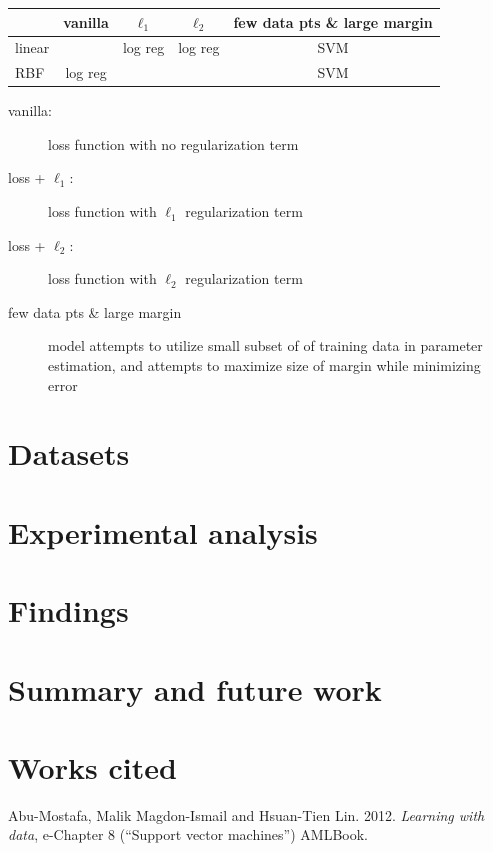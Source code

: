 \documentclass[letterpaper, 11pt]{article}
\begin{document}
\begin{center}
  \begin{tabular}{l|c|c|c|c|}
         & vanilla & $\ell_1$ & $\ell_2$ & few data pts \& large margin \\
\hline
  linear &         & log reg  & log reg  & SVM \\
\hline
  RBF    & log reg &          &          & SVM \\
\hline
\end{tabular}
\end{center}

\begin{description}
\item[vanilla:] loss function with no regularization term \\
\item[loss + $\ell_1$:] loss function with $\ell_1$ regularization term \\
\item[loss + $\ell_2$:] loss function with $\ell_2$ regularization term
\item[few data pts \& large margin] model attempts to utilize small subset of of training data in parameter estimation, and attempts to maximize size of margin while minimizing error 
\end{description}

\section{Datasets}

\section{Experimental analysis}

\section{Findings}

\section{Summary and future work}

\section{Works cited}

Abu-Mostafa, Malik Magdon-Ismail and Hsuan-Tien Lin. 2012. \emph{Learning with data}, e-Chapter 8 (``Support vector machines'') AMLBook.
\end{document}
